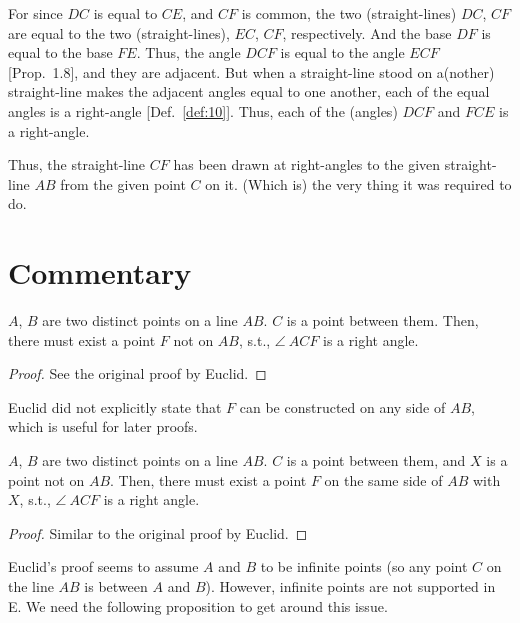 For since $DC$ is equal to $CE$, and $CF$ is common, the two (straight-lines) $DC$, $CF$
are equal to the two (straight-lines), $EC$, $CF$, respectively.  And the base $DF$
is equal to the base $FE$. Thus, the angle $DCF$ is equal to the
angle $ECF$ [Prop.~1.8], and they are adjacent. But when a straight-line stood on 
a(nother) straight-line makes the adjacent angles equal to one another, each of the
equal angles is a right-angle [Def.~\ref{def:10}]. Thus, each of the (angles)
$DCF$ and $FCE$ is a right-angle.

Thus, the straight-line $CF$ has been drawn at right-angles to the
given straight-line $AB$ from the given point $C$ on it. (Which is) the very thing
it was required to do.


\section*{Commentary}

\begin{proposition}\label{proposition_11}\leanok
    $A$, $B$ are two distinct points on a line $AB$. $C$ is a point between them. Then, there must exist a point $F$ not on $AB$, s.t., $\angle~ACF$ is a right angle.
\end{proposition}
\begin{proof}
    \leanok
    See the original proof by Euclid.
\end{proof}

Euclid did not explicitly state that $F$ can be constructed on any side of $AB$, which is useful for later proofs.

\begin{proposition}\label{proposition_11'}\leanok
    $A$, $B$ are two distinct points on a line $AB$. $C$ is a point between them, and $X$ is a point not on $AB$. Then, there must exist a point $F$ on the same side of $AB$ with $X$, s.t., $\angle~ACF$ is a right angle.
\end{proposition}
\begin{proof}
    \leanok
    Similar to the original proof by Euclid.
\end{proof}

Euclid's proof seems to assume $A$ and $B$ to be infinite points (so any point $C$ on the line $AB$ is between $A$ and $B$). However, infinite points are not supported in E. We need the following proposition to get around this issue.

